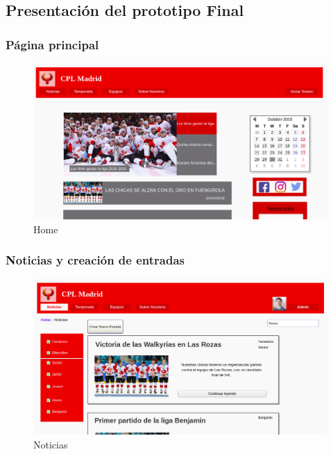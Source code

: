 \documentclass[10pt, spanish, pdftex]{template/UC3M_document}
\begin{document}
\subsection{Presentación del prototipo Final}
  \subsubsection{Página principal}
  \begin{figure}[H]
    \centering
    \includegraphics [width=18.5cm] {Images/Prototipo/home.png}
    \caption{Home}
  \end{figure}

  \subsubsection{Noticias y creación de entradas}
  \begin{figure}[H]
    \centering
    \includegraphics [width=18.5cm]{Images/Prototipo/noticias.png}
    \caption{Noticias}
  \end{figure}
\end{document}
